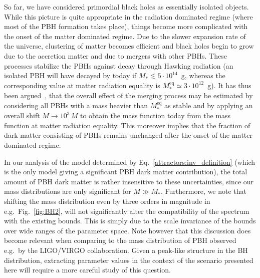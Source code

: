 So far, we have considered primordial black holes as essentially isolated objects. While this picture is quite appropriate in the radiation dominated regime (where most of the PBH formation takes place), things become more complicated with the onset of the matter dominated regime. Due to the slower expansion rate of the universe, clustering of matter becomes efficient and black holes begin to grow due to the accretion matter and due to mergers with other PBHs. These processes stabilize the PBHs against decay through Hawking radiation (an isolated PBH will have decayed by today if $M_* \lesssim 5 \cdot 10^{14}$~g, whereas the corresponding value at matter radiation equality is $M_*^\text{eq} \simeq 3 \cdot 10^{12}$~g). It has thus been argued~\cite{Garcia-Bellido:2017mdw}, that the overall effect of the merging process may be estimated by considering all PBHs with a mass heavier than $M_*^\text{eq}$ as stable and by applying an overall shift $M \rightarrow 10^3 \, M$ to obtain the mass function today from the mass function at matter radiation equality. This moreover implies that the fraction of dark matter consisting of PBHs remains unchanged after the onset of the matter dominated regime.

In our analysis of the model determined by Eq.~\eqref{attractors:inv_definition} (which is the only model giving a significant PBH dark matter contribution), the total amount of PBH dark matter is rather insensitive to these uncertainties, since our mass distributions are only significant for $M \gg M_*$. Furthermore, we note that shifting the mass distribution even by three orders in magnitude in e.g.\ Fig.~\ref{fig:BH2}, will not significantly alter the compatibility of the spectrum with the existing bounds. This is simply due to the scale invariance of the bounds over wide ranges of the parameter space. Note however that this discussion does become relevant when comparing to the mass distribution of PBH observed e.g.\ by the LIGO/VIRGO collaboration. Given a peak-like structure in the BH distribution, extracting parameter values in the context of the scenario presented here will require a more careful study of this question.